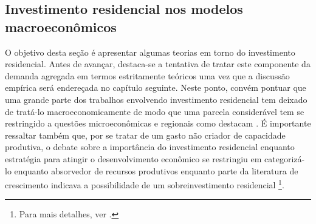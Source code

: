 \subsection{Investimento residencial nos modelos macroeconômicos}
\label{RevResidencial}

O objetivo desta seção é apresentar algumas teorias em torno do investimento residencial. 
Antes de avançar, destaca-se a tentativa de tratar este componente da demanda agregada em termos estritamente teóricos uma vez que a discussão empírica será endereçada no capítulo seguinte. 
Neste ponto, convém pontuar que uma grande parte dos trabalhos envolvendo investimento residencial tem deixado de tratá-lo macroeconomicamente de modo que uma parcela considerável tem se restringido a questões microeconômicas e regionais como destacam \textcite{arestis_u.s._2008}.
É importante ressaltar também que, por se tratar de um gasto não criador de capacidade produtiva, o debate sobre a importância do investimento residencial enquanto estratégia para atingir o desenvolvimento econômico se restringiu em categorizá-lo enquanto absorvedor de recursos produtivos \cite{solow_importance_1995} enquanto parte da literatura de crescimento indicava  a possibilidade de um sobreinvestimento residencial \cite{mills_has_1987}\footnote{Para mais detalhes, ver \textcite{arku_housing_2006}.}.


